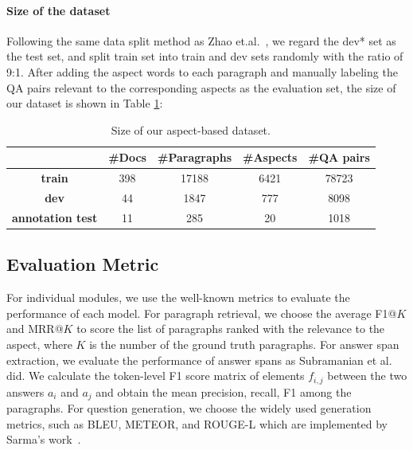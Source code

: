 \paragraph{Size of the dataset}
Following the same data split method as Zhao et.al.~,  we regard the dev* set as the test set, and split train set into train and dev sets randomly with the ratio of 9:1.
After adding the aspect words to each paragraph and manually labeling the QA pairs relevant to the corresponding aspects as the evaluation set, the size of our dataset is shown in Table \ref{tab:size}:
\begin{table}[th]
\scriptsize
\centering
\begin{tabular}{ccccc}
\toprule[1.5pt]
 & \textbf{\#Docs} & \textbf{\#Paragraphs} & \textbf{\#Aspects} & \textbf{\#QA pairs} \\ 
\midrule[1pt]
\textbf{train} & 398 & 17188 & 6421 & 78723 \\ 
\textbf{dev} & 44 & 1847 & 777 & 8098 \\ 
\textbf{annotation test} & 11 & 285 & 20 & 1018 \\ 
\bottomrule[1.5pt]
\end{tabular}
\caption{\label{tab:size} Size of our aspect-based dataset.}
\end{table}

\subsection{Evaluation Metric}
\label{sec:metric}
For individual modules, we use the well-known metrics to evaluate the performance of each model.
For paragraph retrieval, we choose the average F1@$K$ and MRR@$K$ to score the list of paragraphs ranked with the relevance to the aspect, where $K$ is the number of the ground truth paragraphs.
For answer span extraction, we evaluate the performance of answer spans as Subramanian et al.~ did. 
We calculate the token-level F1 score matrix of elements $f_{i,j}$ between the two answers $a_i$ and $a_j$ and obtain the mean precision, recall, F1 among the paragraphs.
For question generation, we choose the widely used generation metrics, such as BLEU, METEOR, and ROUGE-L which are implemented by Sarma's work~\cite{sharma2017relevance}.

